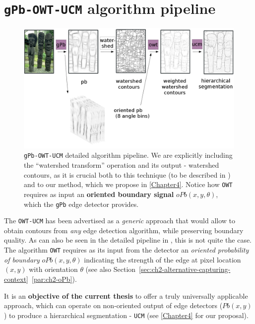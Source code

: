 \section{{\tt gPb-OWT-UCM} algorithm pipeline}
\begin{figure}[t]
\centering
 \includegraphics[width=1\textwidth]{images/gPb-OWT-UCM/gPb-OWT-UCM_pipeline.png}
\caption[{\tt gPb-OWT-UCM} detailed pipeline]{{\tt gPb-OWT-UCM} detailed algorithm pipeline. We are explicitly including the ``watershed transform'' operation and its output - watershed contours, as it is crucial both to this technique (to be described in ) and to our method, which we propose in \cref{Chapter4}. Notice how {\tt OWT} requires as input an {\bf oriented boundary signal} $oPb(x,y,\theta)$, which the {\tt gPb} edge detector provides.}
\label{fig:gPb-OWT-UCM-pipeline}
\end{figure}

The {\tt OWT-UCM} has been advertised \cite{Arbelaez09} as a {\it generic} approach that would allow to obtain contours from {\it any} edge detection algorithm, while preserving boundary quality. As %
can also be seen in the detailed pipeline in , this is not quite the case. %
The algorithm {\tt OWT} requires as its input from the detector %
an {\it oriented probability of boundary} $oPb(x,y,\theta)$ indicating the strength of the edge at pixel location $(x,y)$ with orientation $\theta$ (see also Section~\ref*{sec:ch2-alternative-capturing-context}~\ref{par:ch2-oPb}).

It is an {\bf objective of the current thesis} to offer a truly universally applicable approach, which can operate on non-oriented output of edge detectors ($Pb(x,y)$) to produce a hierarchical segmentation - {\tt UCM} (see \cref{Chapter4} for %
our proposal).

